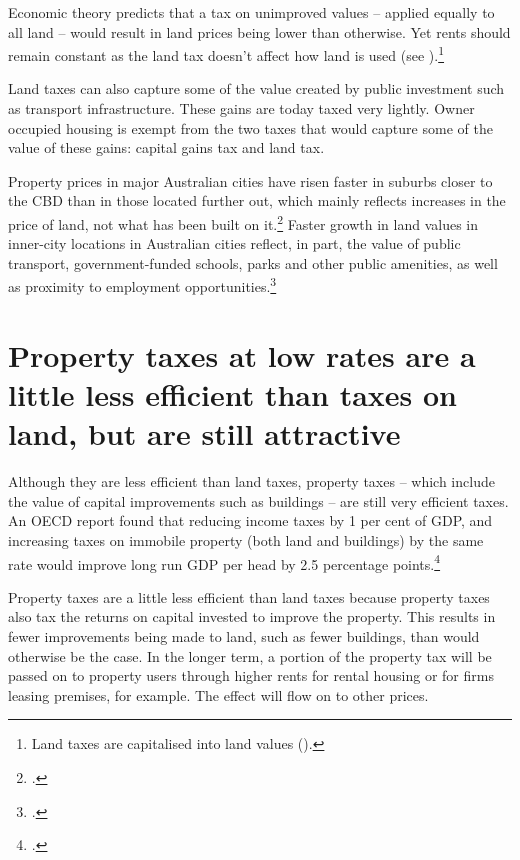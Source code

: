 Economic theory predicts that a tax on unimproved values – applied equally to all land – would result in land prices being lower than otherwise. Yet rents should remain constant as the land tax doesn’t affect how land is used (see ).\footnote{Land taxes are capitalised into land values (\textcite[][247--248]{HenryTaxReview2010}).}   

Land taxes can also capture some of the value created by public investment such as transport infrastructure. These gains are today taxed very lightly. Owner occupied housing is exempt from the two taxes that would capture some of the value of these gains: capital gains tax and land tax. 

Property prices in major Australian cities have risen faster in suburbs closer to the CBD than in those located further out, which mainly reflects increases in the price of land, not what has been built on it.\footcite[][22]{KulishRichardsGillitzer2011}  Faster growth in land values in inner-city locations in Australian cities reflect, in part, the value of public transport, government-funded schools, parks and other public amenities, as well as proximity to employment opportunities.\footcite[][87]{KellyDonegan2015}

\section{Property taxes at low rates are a little less efficient than taxes on land, but are still attractive\label{sec:PROP-4-2}}
Although they are less efficient than land taxes, property taxes -- which include the value of capital improvements such as buildings -- are still very efficient taxes. An OECD report found that reducing income taxes by 1 per cent of GDP, and increasing taxes on immobile property (both land and buildings) by the same rate would improve long run GDP per head by 2.5 percentage points.\footcite[][58]{JohanssonHeadyArnoldEtAl2008}

Property taxes are a little less efficient than land taxes because property taxes also tax the returns on capital invested to improve the property. This results in fewer improvements being made to land, such as fewer buildings, than would otherwise be the case. In the longer term, a portion of the property tax will be passed on to property users through higher rents for rental housing or for firms leasing premises, for example. The effect will flow on to other prices.


